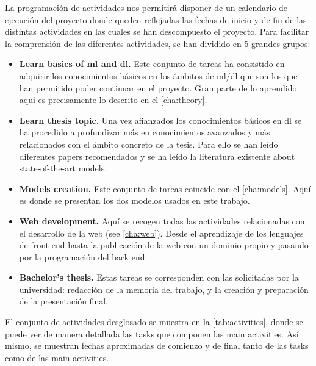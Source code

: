 La programación de actividades nos permitirá disponer de un calendario de
ejecución del proyecto donde queden reflejadas las fechas de inicio y de fin de
las distintas actividades en las cuales se han descompuesto el proyecto. Para
facilitar la comprensión de las diferentes actividades, se han dividido en 5
grandes grupos:
\begin{itemize}
  \item \textbf{Learn basics of \gls{ml} and \gls{dl}.} Este conjunto de tareas
  ha consistido en adquirir los conocimientos básicos en los ámbitos de
  \gls{ml}/\gls{dl} que son los que han permitido poder continuar en el
  proyecto. Gran parte de lo aprendido aquí es precisamente lo descrito en el
  \vref{cha:theory}.
  \item \textbf{Learn thesis topic.} Una vez afianzados los conocimientos
  básicos en \gls{dl} se ha procedido a profundizar más en conocimientos
  avanzados y más relacionados con el ámbito concreto de la tesis. Para ello se
  han leído diferentes papers recomendados y se ha leído la literatura
  existente about state-of-the-art models.
  \item \textbf{Models creation.} Este conjunto de tareas coincide con el
  \vref{cha:models}. Aquí es donde se presentan los dos modelos usados en este
  trabajo.
  \item \textbf{Web development.} Aquí se recogen todas las actividades
  relacionadas con el desarrollo de la web (see \vref{cha:web}). Desde el
  aprendizaje de los lenguajes de front end hasta la publicación de la web con
  un dominio propio y pasando por la programación del back end.
  \item \textbf{Bachelor's thesis.} Estas tareas se corresponden con las
  solicitadas por la universidad: redacción de la memoria del trabajo, y la
  creación y preparación de la presentación final.
\end{itemize}

El conjunto de actividades desglosado se muestra en la
\vref{tab:activities}, donde se puede ver de manera detallada las tasks que
componen las main activities. Así mismo, se muestran fechas aproximadas de
comienzo y de final tanto de las tasks como de las main activities.

